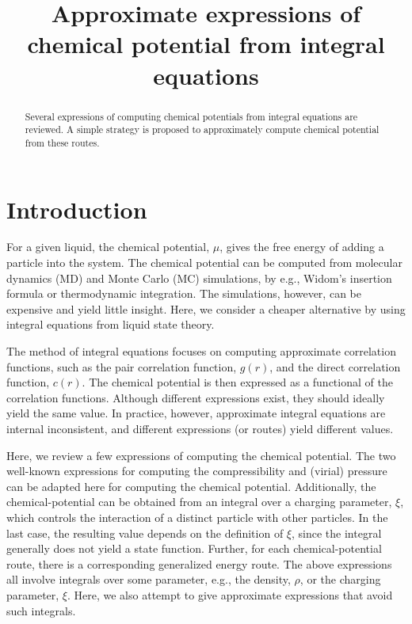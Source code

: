 \documentclass[aip,jcp,reprint,superscriptaddress]{revtex4-1}
\begin{document}
\title{Approximate expressions of chemical potential from integral equations}

\begin{abstract}
  Several expressions of computing
  chemical potentials
  from integral equations
  are reviewed.
  A simple strategy is proposed to approximately
  compute chemical potential
  from these routes.
\end{abstract}
\maketitle





\section{Introduction}



For a given liquid,
the chemical potential, $\mu$,
gives the free energy of adding a particle into the system.
%
The chemical potential can be computed from
molecular dynamics (MD) and
Monte Carlo (MC) simulations,
by e.g., Widom's insertion formula
or thermodynamic integration.
%
The simulations, however, can be expensive
and yield little insight.
%
Here, we consider a cheaper alternative
by using integral equations
from liquid state theory\cite{hansen}.



The method of integral equations
focuses on computing approximate correlation functions,
such as the pair correlation function, $g(r)$,
and the direct correlation function, $c(r)$.
The chemical potential is then expressed
as a functional of the correlation functions.
%
Although different expressions exist,
they should ideally yield the same value.
%
In practice, however,
approximate integral equations
are internal inconsistent,
and different expressions (or routes)
yield different values.
%
%



Here, we review
a few expressions of computing the chemical potential.
%
The two well-known expressions
for computing the compressibility and (virial) pressure
can be adapted here for computing the chemical potential.
%
Additionally,
the chemical-potential can be obtained
from an integral over a charging parameter, $\xi$,
which controls the interaction
of a distinct particle with other particles.
%
In the last case,
the resulting value depends on the definition of $\xi$,
since the integral generally does not yield a state function.
%
Further,
for each chemical-potential route,
there is a corresponding generalized energy route.
%
The above expressions all involve integrals
over some parameter,
e.g., the density, $\rho$,
or the charging parameter, $\xi$.
%
Here, we also attempt to give approximate expressions
that avoid such integrals.
\end{document}
